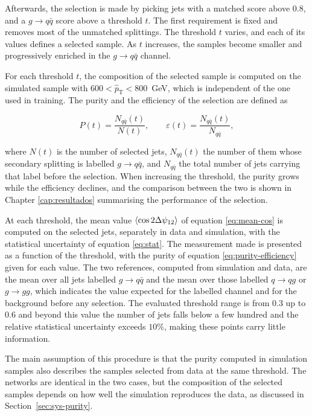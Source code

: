 Afterwards, the selection is made by picking jets with a matched score
above $0.8$, and a $g \to q\bar{q}$ score above a threshold $t$. The first requirement
is fixed and removes most of the unmatched splittings. The threshold
$t$ varies, and each of its values defines a selected sample. As $t$
increases, the samples become smaller and progressively enriched in the
$g \to q\bar{q}$ channel.

For each threshold $t$, the composition of the selected sample is computed on the simulated
sample with $600 < \hat{p}_{\mathrm{T}} < 800$~GeV, which is independent
of the one used in training. The purity and the efficiency of the selection are
defined as

\begin{equation}
  P(t) = \frac{N_{q\bar{q}}(t)}{N(t)},
  \qquad
  \varepsilon(t) = \frac{N_{q\bar{q}}(t)}{N_{q\bar{q}}},
  \label{eq:purity-efficiency}
\end{equation}

where $N(t)$ is the number of selected jets, $N_{q\bar{q}}(t)$ the number of them
whose secondary splitting is labelled $g \to q\bar{q}$, and $N_{q\bar{q}}$ the total
number of jets carrying that label before the selection. When increasing the threshold,
the purity grows while the efficiency declines, and the comparison between the two
is shown in Chapter \ref{cap:resultados} summarising the performance of the selection.

At each threshold, the mean value $\langle \cos 2\Delta\psi_{12} \rangle$ of
equation \eqref{eq:mean-cos} is computed on the selected jets, separately in data and simulation,
with the statistical uncertainty of equation \eqref{eq:stat}. The measurement made is presented
as a function of the threshold, with the purity of equation \eqref{eq:purity-efficiency} given for each value.
The two references, computed from simulation and data, are the mean over all jets labelled $g \to q\bar{q}$ and the
mean over those labelled $q \to qg$ or $g \to gg$, which indicates the value expected 
for the labelled channel and for the background before any selection.
The evaluated threshold range is from $0.3$ up to $0.6$ and beyond this value the number
of jets falls below a few hundred and the relative statistical
uncertainty exceeds $10\%$, making these points carry little
information.

The main assumption of this procedure is that the purity computed in simulation samples also
describes the samples selected from data at the same threshold. The
networks are identical in the two cases, but the composition of the selected
samples depends on how well the simulation reproduces the data, as discussed in
Section~\ref{sec:sys-purity}.

